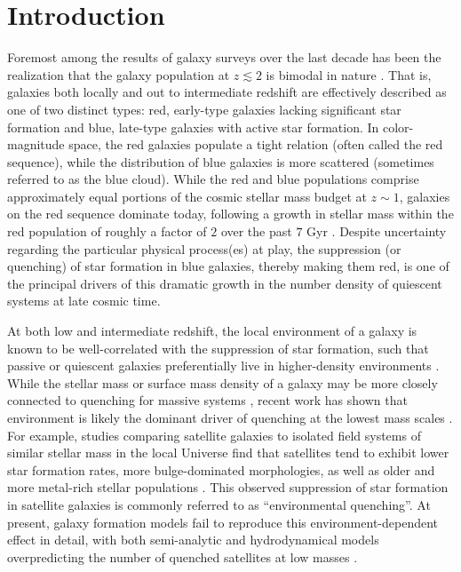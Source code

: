 \documentclass[usenatbib]{mn2e}
\newcommand{\mstar}{{\rm M}_{\star}}
\newcommand{\msun}{{\rm M}_{\odot}}
\begin{document}
\section{Introduction}
\label{sec:intro} 

Foremost among the results of galaxy surveys over the last decade has
been the realization that the galaxy population at $z \lesssim 2$ is
bimodal in nature \citep[e.g.][]{strateva01, baldry04, bell04,
  cooper06}. That is, galaxies both locally and out to intermediate
redshift are effectively described as one of two distinct types: red,
early-type galaxies lacking significant star formation and blue,
late-type galaxies with active star formation. In color-magnitude
space, the red galaxies populate a tight relation (often called the
red sequence), while the distribution of blue galaxies is more
scattered (sometimes referred to as the blue cloud).
%
While the red and blue populations comprise approximately equal
portions of the cosmic stellar mass budget at $z \sim 1$, galaxies on
the red sequence dominate today, following a growth in stellar mass
within the red population of roughly a factor of $2$ over the past $7$
Gyr \citep{bell04, bundy06, faber07, brown07}.
%
Despite uncertainty regarding the particular physical process(es) at play,
the suppression (or quenching) of star formation in blue galaxies,
thereby making them red, is one of the principal drivers of this
dramatic growth in the number density of quiescent systems at late
cosmic time.


At both low and intermediate redshift, the local environment of a
galaxy is known to be well-correlated with the suppression of star
formation, such that passive or quiescent galaxies preferentially live
in higher-density environments \citep{balogh04, kauffmann04, blanton05,
  cooper06, cooper07, cooper10b}.
%
While the stellar mass or surface mass density of a galaxy may be more
closely connected to quenching for massive systems \citep{peng10,
  cheung12, woo13}, recent work has shown that environment is likely
the dominant driver of quenching at the lowest mass scales
\citep[$\mstar < 10^9~\msun$,][]{geha12}.  For example, studies
comparing satellite galaxies to isolated field systems of similar
stellar mass in the local Universe find that satellites tend to
exhibit lower star formation rates, more bulge-dominated morphologies,
as well as older and more metal-rich stellar populations
\citep{baldry06, vdb08, cooper10a, pasquali10, tollerud11,phillips14}. This
observed suppression of star formation in satellite galaxies is
commonly referred to as ``environmental quenching''.
%
At present, galaxy formation models fail to reproduce this
environment-dependent effect in detail, with both semi-analytic and
hydrodynamical models overpredicting the number of quenched satellites
at low masses \citep{kimm09, weinmann11, weinmann12, hirschmann14,
  wang14}.
\end{document}

